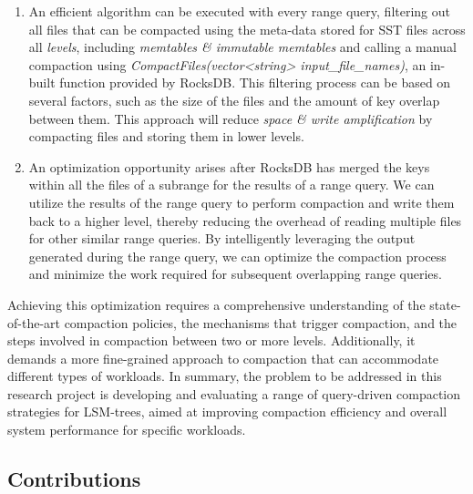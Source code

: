 \documentclass[balance=false, sigconf]{acmart}
\begin{document}
\begin{enumerate}
    \item An efficient algorithm can be executed with every range query, filtering out all 
files that can be compacted using the meta-data stored 
for SST files across all \textit{levels}, including \textit{memtables \& immutable memtables}
and calling a manual compaction using \textit{CompactFiles(vector<string> input\_file\_names)}, an in-built function provided by 
RocksDB. This filtering process can be based on several factors, such as the size of the files and the amount of key overlap between them. This approach will reduce \textit{space \& write 
amplification} by compacting files and storing them in lower levels.

\item An optimization opportunity arises after RocksDB has merged the keys within all the files of a subrange for the results of a range query. We can utilize the 
results of the range query to perform compaction and write them back to a higher level, thereby reducing 
the overhead of reading multiple files for other similar range queries. By intelligently leveraging 
the output generated during the range query, we can optimize the compaction process and minimize the 
work required for subsequent overlapping range queries.
\end{enumerate} 

Achieving this optimization requires a comprehensive understanding of the state-of-the-art compaction 
policies, the mechanisms that trigger compaction, and the steps involved in compaction between two or 
more levels. Additionally, it demands a more fine-grained approach to compaction that can accommodate 
different types of workloads. In summary, the problem to be addressed in this research project is developing and evaluating a range of query-driven compaction strategies for LSM-trees, aimed at improving 
compaction efficiency and overall system performance for specific workloads.

\subsection{Contributions}
\end{document}
